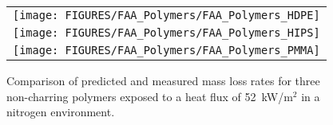 \newpage

\begin{figure}[p]
\begin{center}
\begin{tabular}{c}
\texttt{[image: FIGURES/FAA\_Polymers/FAA\_Polymers\_HDPE]} \\
\texttt{[image: FIGURES/FAA\_Polymers/FAA\_Polymers\_HIPS]} \\
\texttt{[image: FIGURES/FAA\_Polymers/FAA\_Polymers\_PMMA]}
\end{tabular}
\end{center}
\caption[Results of FAA Polymers comparison]{Comparison of predicted and measured mass loss rates for three non-charring polymers exposed to a heat flux of 52~kW/m$^2$ in a
nitrogen environment.}
\label{FAA_Polymers}
\end{figure}

